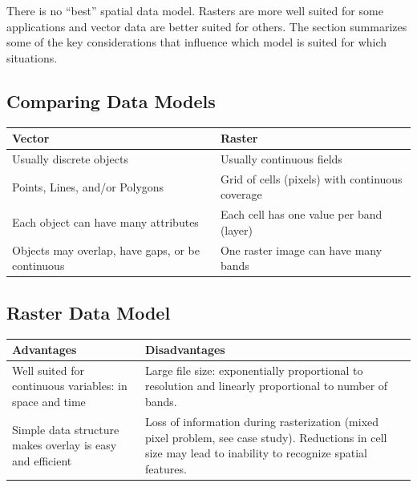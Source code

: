 \documentclass[
]{book}
\begin{document}
There is no ``best'' spatial data model. Rasters are more well suited for some applications and vector data are better suited for others. The section summarizes some of the key considerations that influence which model is suited for which situations.

\hypertarget{comparing-data-models}{%
\subsection{Comparing Data Models}\label{comparing-data-models}}

\begin{longtable}[]{@{}
  >{\raggedright\arraybackslash}p{}
  >{\raggedright\arraybackslash}p{}@{}}
\toprule
Vector & Raster \\
\midrule
\endhead
Usually discrete objects & Usually continuous fields \\
Points, Lines, and/or Polygons & Grid of cells (pixels) with continuous coverage \\
Each object can have many attributes & Each cell has one value per band (layer) \\
Objects may overlap, have gaps, or be continuous & One raster image can have many bands \\
\bottomrule
\end{longtable}

\hypertarget{raster-data-model-1}{%
\subsection{Raster Data Model}\label{raster-data-model-1}}

\begin{longtable}[]{@{}
  >{\raggedright\arraybackslash}p{}
  >{\raggedright\arraybackslash}p{}@{}}
\toprule
Advantages & Disadvantages \\
\midrule
\endhead
Well suited for continuous variables: in space and time & Large file size: exponentially proportional to resolution and linearly proportional to number of bands. \\
Simple data structure makes overlay is easy and efficient & Loss of information during rasterization (mixed pixel problem, see case study). Reductions in cell size may lead to inability to recognize spatial features. \\
\bottomrule
\end{longtable}
\end{document}
